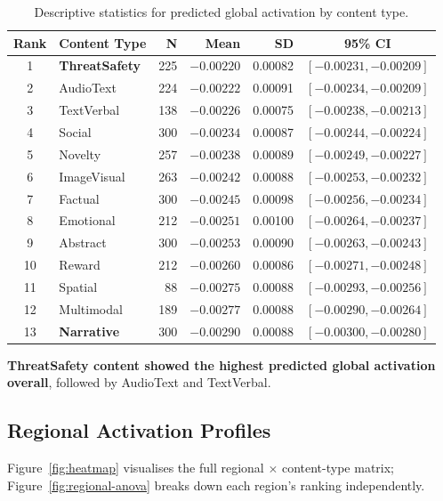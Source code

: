 \documentclass[11pt,letterpaper]{article}
\begin{document}
\begin{table}[ht]
\centering
\small
\caption{Descriptive statistics for predicted global activation by content type.}
\label{tab:descriptive}
\begin{tabular}{c l r r r c}
\toprule
\textbf{Rank} & \textbf{Content Type} & \textbf{N} & \textbf{Mean} & \textbf{SD} & \textbf{95\% CI} \\
\midrule
 1 & \textbf{ThreatSafety} & 225 & $-0.00220$ & 0.00082 & $[-0.00231, -0.00209]$ \\
 2 & AudioText             & 224 & $-0.00222$ & 0.00091 & $[-0.00234, -0.00209]$ \\
 3 & TextVerbal            & 138 & $-0.00226$ & 0.00075 & $[-0.00238, -0.00213]$ \\
 4 & Social                & 300 & $-0.00234$ & 0.00087 & $[-0.00244, -0.00224]$ \\
 5 & Novelty               & 257 & $-0.00238$ & 0.00089 & $[-0.00249, -0.00227]$ \\
 6 & ImageVisual           & 263 & $-0.00242$ & 0.00088 & $[-0.00253, -0.00232]$ \\
 7 & Factual               & 300 & $-0.00245$ & 0.00098 & $[-0.00256, -0.00234]$ \\
 8 & Emotional             & 212 & $-0.00251$ & 0.00100 & $[-0.00264, -0.00237]$ \\
 9 & Abstract              & 300 & $-0.00253$ & 0.00090 & $[-0.00263, -0.00243]$ \\
10 & Reward                & 212 & $-0.00260$ & 0.00086 & $[-0.00271, -0.00248]$ \\
11 & Spatial               &  88 & $-0.00275$ & 0.00088 & $[-0.00293, -0.00256]$ \\
12 & Multimodal            & 189 & $-0.00277$ & 0.00088 & $[-0.00290, -0.00264]$ \\
13 & \textbf{Narrative}    & 300 & $-0.00290$ & 0.00088 & $[-0.00300, -0.00280]$ \\
\bottomrule
\end{tabular}
\end{table}

\textbf{ThreatSafety content showed the highest predicted global activation overall}, followed by AudioText and TextVerbal.

\subsection{Regional Activation Profiles}

Figure~\ref{fig:heatmap} visualises the full regional $\times$ content-type matrix; Figure~\ref{fig:regional-anova} breaks down each region's ranking independently.
\end{document}
